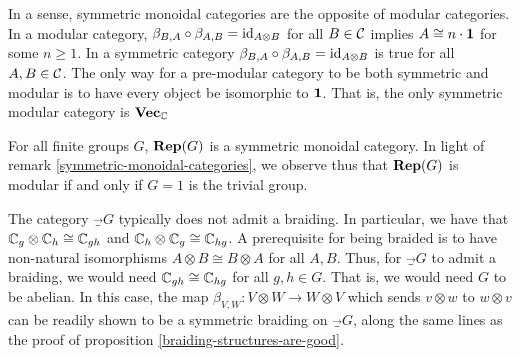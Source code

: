 \begin{rem}\label{symmetric-monoidal-categories} In a sense, symmetric monoidal categories are the opposite of modular categories. In a modular category, $\beta_{B,A}\circ \beta_{A,B}=\operatorname{id}_{A\otimes B}$ for all $B\in {\mathcal C}$ implies $A\cong n\cdot {\mathbf 1}$ for some $n\geq 1$. In a symmetric category $\beta_{B,A}\circ \beta_{A,B}=\operatorname{id}_{A\otimes B}$ is true for all $A,B\in {\mathcal C}$. The only way for a pre-modular category to be both symmetric and modular is to have every object be isomorphic to ${\mathbf 1}$. That is, the only symmetric modular category is ${\bf Vec}_{{\mathbb C}}$
\end{rem}

\begin{ex}
For all finite groups $G$, ${\bf Rep}(G)$ is a symmetric monoidal category. In light of remark \ref{symmetric-monoidal-categories}, we observe thus that ${\bf Rep}(G)$ is modular if and only if $G=1$ is the trivial group.
\end{ex}

\begin{ex}
The category $\Vec_G$ typically does not admit a braiding. In particular, we have that ${\mathbb C}_g\otimes {\mathbb C}_h\cong{\mathbb C}_{gh}$ and ${\mathbb C}_h\otimes {\mathbb C}_g\cong {\mathbb C}_{hg}$. A prerequisite for being braided is to have non-natural isomorphisms $A\otimes B\cong B\otimes A$ for all $A,B$. Thus, for $\Vec_G$ to admit a braiding, we would need ${\mathbb C}_{gh}\cong {\mathbb C}_{hg}$ for all $g,h\in G$. That is, we would need $G$ to be abelian. In this case, the map $\beta_{V,W}:V\otimes W\to W\otimes V$ which sends $v\otimes w$ to $w\otimes v$ can be readily shown to be a symmetric braiding on $\Vec_G$, along the same lines as the proof of proposition \ref{braiding-structures-are-good}.
\end{ex}

